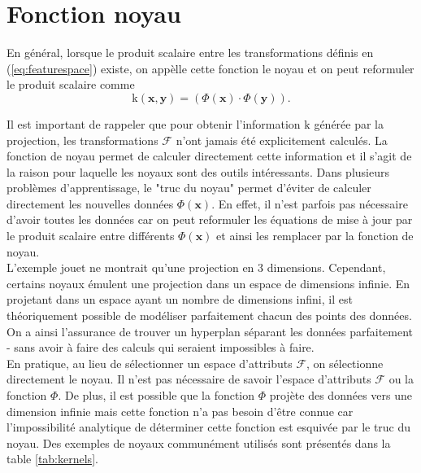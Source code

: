 \section{Fonction noyau}\label{sec:kernel}

En général, lorsque le produit scalaire entre les transformations définis en (\ref{eq:featurespace}) existe, on appèlle cette fonction le noyau et on peut reformuler le produit scalaire comme
$$\textrm{k}(\textbf{x}, \textbf{y}) = (\Phi(\textbf{x})\cdot \Phi(\textbf{y})).$$

Il est important de rappeler que pour obtenir l’information $\textrm{k}$ générée par la projection, les transformations $\mathcal{F}$ n'ont jamais été explicitement calculés. La fonction de noyau permet de calculer directement cette information et il s’agit de la raison pour laquelle les noyaux sont des outils intéressants. Dans plusieurs problèmes d'apprentissage, le "truc du noyau" permet d'éviter de calculer directement les nouvelles données $\Phi(\textbf{x})$. En effet, il n'est parfois pas nécessaire d'avoir toutes les données car on peut reformuler les équations de mise à jour par le produit scalaire entre différents $\Phi(\textbf{x})$ et ainsi les remplacer par la fonction de noyau. \\

L'exemple jouet ne montrait qu’une projection en 3 dimensions. Cependant, certains noyaux émulent une projection dans un espace de dimensions infinie. En projetant dans un espace ayant un nombre de dimensions infini, il est théoriquement possible de modéliser parfaitement chacun des points des données. On a ainsi l’assurance de trouver un hyperplan séparant les données parfaitement - sans avoir à faire des calculs qui seraient impossibles à faire.\\



En pratique, au lieu de sélectionner un espace d'attributs $\mathcal{F}$, on sélectionne directement le noyau. Il n'est pas nécessaire de savoir l'espace d'attributs $\mathcal{F}$ ou la fonction $\Phi$. De plus, il est possible que la fonction $\Phi$ projète des données vers une dimension infinie mais cette fonction n'a pas besoin d’être connue car l'impossibilité analytique de déterminer cette fonction est esquivée par le truc du noyau. Des exemples de noyaux communément utilisés sont présentés dans la table \ref{tab:kernels}.

